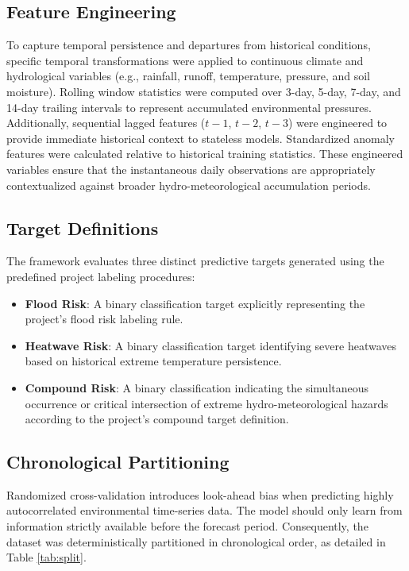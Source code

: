 \subsection{Feature Engineering}
To capture temporal persistence and departures from historical conditions, specific temporal transformations were applied to continuous climate and hydrological variables (e.g., rainfall, runoff, temperature, pressure, and soil moisture). Rolling window statistics were computed over 3-day, 5-day, 7-day, and 14-day trailing intervals to represent accumulated environmental pressures. Additionally, sequential lagged features ($t-1$, $t-2$, $t-3$) were engineered to provide immediate historical context to stateless models. Standardized anomaly features were calculated relative to historical training statistics. These engineered variables ensure that the instantaneous daily observations are appropriately contextualized against broader hydro-meteorological accumulation periods.

\subsection{Target Definitions}
The framework evaluates three distinct predictive targets generated using the predefined project labeling procedures:
\begin{itemize}
    \item \textbf{Flood Risk}: A binary classification target explicitly representing the project's flood risk labeling rule.
    \item \textbf{Heatwave Risk}: A binary classification target identifying severe heatwaves based on historical extreme temperature persistence.
    \item \textbf{Compound Risk}: A binary classification indicating the simultaneous occurrence or critical intersection of extreme hydro-meteorological hazards according to the project's compound target definition.
\end{itemize}

\subsection{Chronological Partitioning}
Randomized cross-validation introduces look-ahead bias when predicting highly autocorrelated environmental time-series data. The model should only learn from information strictly available before the forecast period. Consequently, the dataset was deterministically partitioned in chronological order, as detailed in Table \ref{tab:split}.


